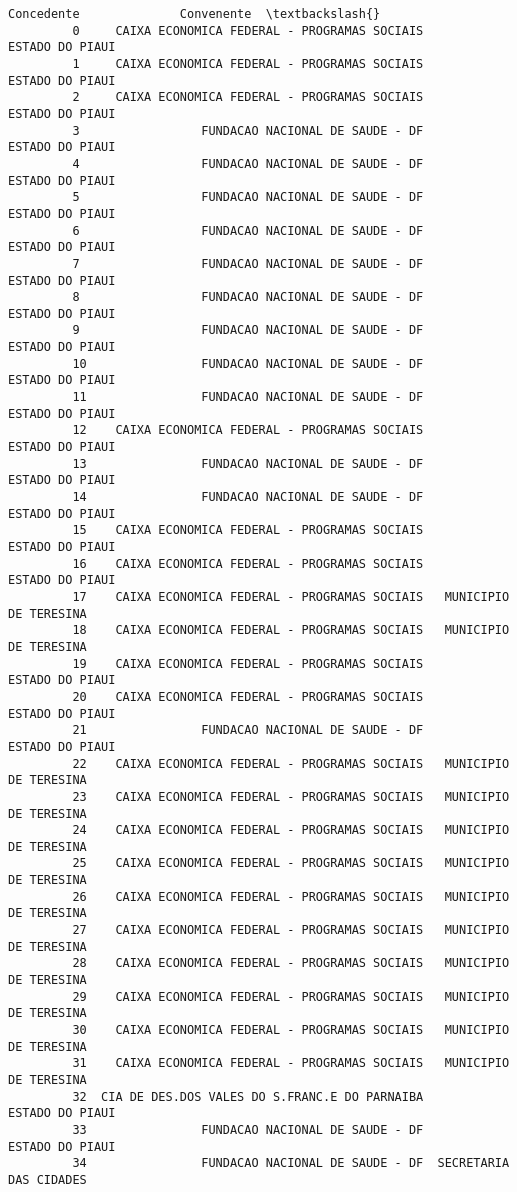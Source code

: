 \documentclass[11pt]{article}
\begin{document}
\begin{Verbatim}[commandchars=\\\{\}]
                                                Concedente              Convenente  \textbackslash{}
         0     CAIXA ECONOMICA FEDERAL - PROGRAMAS SOCIAIS         ESTADO DO PIAUI   
         1     CAIXA ECONOMICA FEDERAL - PROGRAMAS SOCIAIS         ESTADO DO PIAUI   
         2     CAIXA ECONOMICA FEDERAL - PROGRAMAS SOCIAIS         ESTADO DO PIAUI   
         3                 FUNDACAO NACIONAL DE SAUDE - DF         ESTADO DO PIAUI   
         4                 FUNDACAO NACIONAL DE SAUDE - DF         ESTADO DO PIAUI   
         5                 FUNDACAO NACIONAL DE SAUDE - DF         ESTADO DO PIAUI   
         6                 FUNDACAO NACIONAL DE SAUDE - DF         ESTADO DO PIAUI   
         7                 FUNDACAO NACIONAL DE SAUDE - DF         ESTADO DO PIAUI   
         8                 FUNDACAO NACIONAL DE SAUDE - DF         ESTADO DO PIAUI   
         9                 FUNDACAO NACIONAL DE SAUDE - DF         ESTADO DO PIAUI   
         10                FUNDACAO NACIONAL DE SAUDE - DF         ESTADO DO PIAUI   
         11                FUNDACAO NACIONAL DE SAUDE - DF         ESTADO DO PIAUI   
         12    CAIXA ECONOMICA FEDERAL - PROGRAMAS SOCIAIS         ESTADO DO PIAUI   
         13                FUNDACAO NACIONAL DE SAUDE - DF         ESTADO DO PIAUI   
         14                FUNDACAO NACIONAL DE SAUDE - DF         ESTADO DO PIAUI   
         15    CAIXA ECONOMICA FEDERAL - PROGRAMAS SOCIAIS         ESTADO DO PIAUI   
         16    CAIXA ECONOMICA FEDERAL - PROGRAMAS SOCIAIS         ESTADO DO PIAUI   
         17    CAIXA ECONOMICA FEDERAL - PROGRAMAS SOCIAIS   MUNICIPIO DE TERESINA   
         18    CAIXA ECONOMICA FEDERAL - PROGRAMAS SOCIAIS   MUNICIPIO DE TERESINA   
         19    CAIXA ECONOMICA FEDERAL - PROGRAMAS SOCIAIS         ESTADO DO PIAUI   
         20    CAIXA ECONOMICA FEDERAL - PROGRAMAS SOCIAIS         ESTADO DO PIAUI   
         21                FUNDACAO NACIONAL DE SAUDE - DF         ESTADO DO PIAUI   
         22    CAIXA ECONOMICA FEDERAL - PROGRAMAS SOCIAIS   MUNICIPIO DE TERESINA   
         23    CAIXA ECONOMICA FEDERAL - PROGRAMAS SOCIAIS   MUNICIPIO DE TERESINA   
         24    CAIXA ECONOMICA FEDERAL - PROGRAMAS SOCIAIS   MUNICIPIO DE TERESINA   
         25    CAIXA ECONOMICA FEDERAL - PROGRAMAS SOCIAIS   MUNICIPIO DE TERESINA   
         26    CAIXA ECONOMICA FEDERAL - PROGRAMAS SOCIAIS   MUNICIPIO DE TERESINA   
         27    CAIXA ECONOMICA FEDERAL - PROGRAMAS SOCIAIS   MUNICIPIO DE TERESINA   
         28    CAIXA ECONOMICA FEDERAL - PROGRAMAS SOCIAIS   MUNICIPIO DE TERESINA   
         29    CAIXA ECONOMICA FEDERAL - PROGRAMAS SOCIAIS   MUNICIPIO DE TERESINA   
         30    CAIXA ECONOMICA FEDERAL - PROGRAMAS SOCIAIS   MUNICIPIO DE TERESINA   
         31    CAIXA ECONOMICA FEDERAL - PROGRAMAS SOCIAIS   MUNICIPIO DE TERESINA   
         32  CIA DE DES.DOS VALES DO S.FRANC.E DO PARNAIBA         ESTADO DO PIAUI   
         33                FUNDACAO NACIONAL DE SAUDE - DF         ESTADO DO PIAUI   
         34                FUNDACAO NACIONAL DE SAUDE - DF  SECRETARIA DAS CIDADES   
         

\end{Verbatim}
\end{document}

